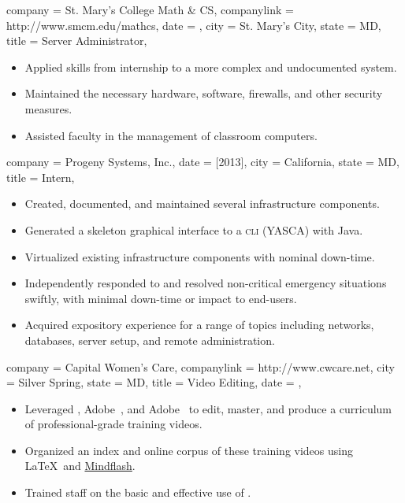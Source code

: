 \documentclass[
textout=\jobname.cv.txt,
textout preamble = preamble.txt,
]{bettercv}
\begin{document}
\begin{position}
  {
    company = St. Mary's College \Dash Math \& CS,
    companylink = http://www.smcm.edu/mathcs,
    date    = ,
    city    = St. Mary's City,
    state   = MD,
    title   = Server Administrator,
  }

\begin{itemize}
\item Applied skills from internship to a more complex and undocumented system.
\item Maintained the necessary hardware, software, firewalls, and other security measures.
\item Assisted faculty in the management of classroom computers.
\end{itemize}
\end{position}

\begin{position}
  {
    company = {Progeny Systems, Inc.},
    date    = [2013],
    city    = California,
    state   = MD,
    title   = Intern,
  }

\begin{itemize}
\item Created, documented, and maintained several infrastructure components.
\item Generated a skeleton graphical interface to a \textsc{cli} (YASCA) with Java.
\item Virtualized existing infrastructure components with nominal down-time.
\item Independently responded to and resolved non-critical emergency situations swiftly, with minimal down-time or impact to end-users.
\item Acquired expository experience for a range of topics including
  networks,
  databases,
  server setup, and
  remote administration.
\end{itemize}
\end{position}

\begin{position}
  {
    company = Capital Women's Care,
    companylink = http://www.cwcare.net,
    city    = Silver Spring,
    state   = MD,
    title   = Video Editing,
    date    = ,
  }

\begin{itemize}
\item Leveraged ,
  Adobe~, and
  Adobe~ to edit, master, and produce
    a curriculum of professional-grade training videos.
  \item Organized an index and online corpus of these training videos
    using \LaTeX\ and \href{http://www.mindflash.com}{Mindflash}.
\item Trained staff on the basic and effective use of .
\end{itemize}
\end{position}
\end{document}
